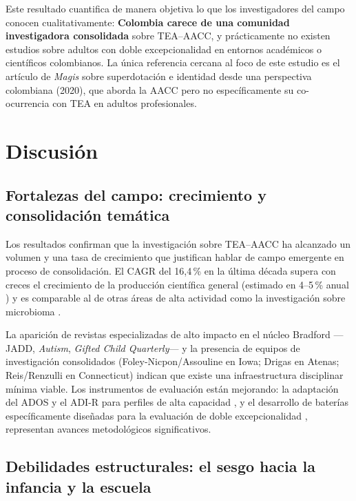 \documentclass[12pt, a4paper]{article}
\begin{document}
Este resultado cuantifica de manera objetiva lo que los investigadores del campo
conocen cualitativamente: \textbf{Colombia carece de una comunidad investigadora
consolidada} sobre TEA--AACC, y prácticamente no existen estudios sobre adultos
con doble excepcionalidad en entornos académicos o científicos colombianos. La
única referencia cercana al foco de este estudio es el artículo de \textit{Magis}
sobre superdotación e identidad desde una perspectiva colombiana (2020), que aborda
la AACC pero no específicamente su co-ocurrencia con TEA en adultos profesionales.

\section{Discusión}
\label{sec:discusion}

\subsection{Fortalezas del campo: crecimiento y consolidación temática}

Los resultados confirman que la investigación sobre TEA--AACC ha alcanzado un
volumen y una tasa de crecimiento que justifican hablar de campo emergente en
proceso de consolidación. El CAGR del 16,4\,\% en la última década supera con
creces el crecimiento de la producción científica general (estimado en 4--5\,\%
anual \parencite{bornmann2021}) y es comparable al de otras áreas de alta
actividad como la investigación sobre microbioma \parencite{chen2022}.

La aparición de revistas especializadas de alto impacto en el núcleo Bradford
—JADD, \textit{Autism}, \textit{Gifted Child Quarterly}— y la presencia de equipos
de investigación consolidados (Foley-Nicpon/Assouline en Iowa; Drigas en Atenas;
Reis/Renzulli en Connecticut) indican que existe una infraestructura disciplinar
mínima viable. Los instrumentos de evaluación están mejorando: la adaptación del
ADOS y el ADI-R para perfiles de alta capacidad \parencite{foleynicpon2017}, y el
desarrollo de baterías específicamente diseñadas para la evaluación de doble
excepcionalidad \parencite{cederberg2018}, representan avances metodológicos
significativos.

\subsection{Debilidades estructurales: el sesgo hacia la infancia y la escuela}
\end{document}
